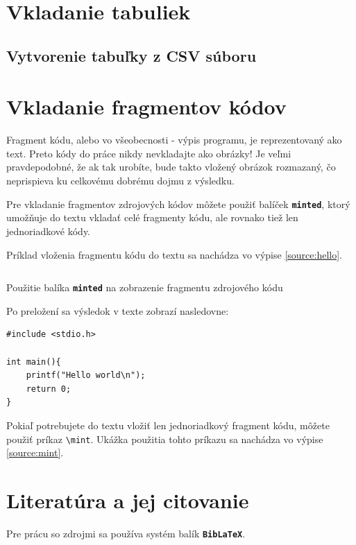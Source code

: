 \section{Vkladanie tabuliek}

\subsection{Vytvorenie tabuľky z CSV súboru}

\section{Vkladanie fragmentov kódov}

Fragment kódu, alebo vo všeobecnosti - výpis programu, je reprezentovaný ako text. Preto kódy do práce nikdy nevkladajte ako obrázky! Je veľmi pravdepodobné, že ak tak urobíte, bude takto vložený obrázok rozmazaný, čo neprispieva ku celkovému dobrému dojmu z výsledku.

Pre vkladanie fragmentov zdrojových kódov môžete použiť balíček {\bf\tt minted}, ktorý umožňuje do textu vkladať celé fragmenty kódu, ale rovnako tiež len jednoriadkové kódy. 

Príklad vloženia fragmentu kódu do textu sa nachádza vo výpise \ref{source:hello}.


\begin{listing}[ht]
\inputminted[frame=lines]{latex}{examples/hello.world.tex}
\caption{Použitie balíka {\tt\bf minted} na zobrazenie fragmentu zdrojového kódu}\label{source:hello}
\end{listing}

Po preložení sa výsledok v texte zobrazí nasledovne:

\begin{verbatim}
#include <stdio.h>

int main(){
    printf("Hello world\n");
    return 0;
}
\end{verbatim}

Pokiaľ potrebujete do textu vložiť len jednoriadkový fragment kódu, môžete použiť príkaz {\tt\textbackslash{mint}}. Ukážka použitia tohto príkazu sa nachádza vo výpise \ref{source:mint}.


\section{Literatúra a jej citovanie}

Pre prácu so zdrojmi sa používa systém balík {\tt \bf BibLaTeX}.
\inputminted{latex}{chapters/bibliography.bib}


